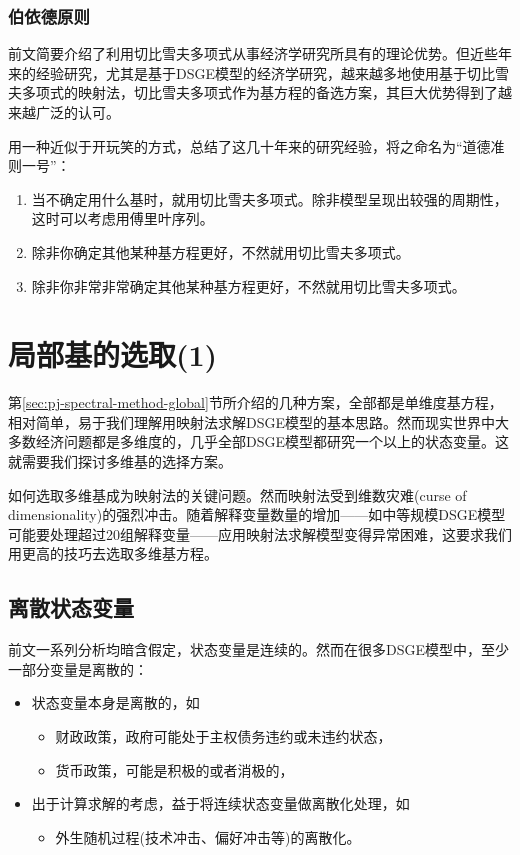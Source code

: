 \subsubsection{伯依德原则}
前文简要介绍了利用切比雪夫多项式从事经济学研究所具有的理论优势。但近些年来的经验研究，尤其是基于DSGE模型的经济学研究，越来越多地使用基于切比雪夫多项式的映射法，切比雪夫多项式作为基方程的备选方案，其巨大优势得到了越来越广泛的认可\citep{Aruoba:2006cz,Caldara:2012fr}。

\cite[p.10]{Boyd:2001wt}用一种近似于开玩笑的方式，总结了这几十年来的研究经验，将之命名为``道德准则一号''：
\begin{enumerate}
  \item 当不确定用什么基时，就用切比雪夫多项式。除非模型呈现出较强的周期性，这时可以考虑用傅里叶序列。
  \item 除非你确定其他某种基方程更好，不然就用切比雪夫多项式。
  \item 除非你非常非常确定其他某种基方程更好，不然就用切比雪夫多项式。
\end{enumerate}

\section{局部基的选取(1)}
\label{sec:pj-method-local}

第\ref{sec:pj-spectral-method-global}节所介绍的几种方案，全部都是单维度基方程，相对简单，易于我们理解用映射法求解DSGE模型的基本思路。然而现实世界中大多数经济问题都是多维度的，几乎全部DSGE模型都研究一个以上的状态变量。这就需要我们探讨多维基的选择方案。

如何选取多维基成为映射法的关键问题。然而映射法受到维数灾难(curse of dimensionality)的强烈冲击\citep{Bellman:1957tx}。随着解释变量数量的增加——如中等规模DSGE模型可能要处理超过20组解释变量——应用映射法求解模型变得异常困难，这要求我们用更高的技巧去选取多维基方程。

\subsection{离散状态变量}
\label{sec:pj-multidimen-discrete-state-variables}
前文一系列分析均暗含假定，状态变量是连续的。然而在很多DSGE模型中，至少一部分变量是离散的：
\begin{itemize}
  \item 状态变量本身是离散的，如
  \begin{itemize}
    \item 财政政策，政府可能处于主权债务违约或未违约状态\citep{Bocola:2016ij}，
    \item 货币政策，可能是积极的或者消极的\citep{Leeper:1991kq}，
  \end{itemize}
  \item 出于计算求解的考虑，益于将连续状态变量做离散化处理，如
  \begin{itemize}
    \item 外生随机过程(技术冲击、偏好冲击等)的离散化。
  \end{itemize}
\end{itemize}

